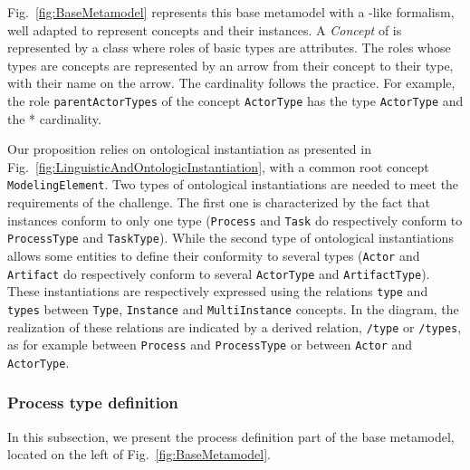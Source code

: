 Fig.~\ref{fig:BaseMetamodel} represents this base metamodel with a \UML-like
formalism, well adapted to represent \FML concepts and their instances. A
\textit{Concept} of \FML is represented by a \UML class where roles of basic
types are attributes. The roles whose types are concepts are represented by an
arrow from their concept to their type, with their name on the arrow. The
cardinality follows the \UML practice.  For example, the role
\texttt{parentActorTypes} of the concept \texttt{ActorType} has the type
\texttt{ActorType} and the * cardinality.

Our proposition relies on ontological instantiation as presented in
Fig.~\ref{fig:LinguisticAndOntologicInstantiation}, with a common root concept
\texttt{ModelingElement}. Two types of ontological instantiations are needed to
meet the requirements of the challenge. 
The first one is characterized by the fact that instances conform to only one
type (\texttt{Process} and \texttt{Task} do respectively conform to
\texttt{ProcessType} and \texttt{TaskType}). While the second type of
ontological instantiations allows some entities to define their conformity to
several types (\texttt{Actor} and \texttt{Artifact} do respectively conform to
several \texttt{ActorType} and \texttt{ArtifactType}). 
These instantiations are respectively expressed using
the relations \texttt{type} and \texttt{types} between \texttt{Type},
\texttt{Instance} and \texttt{MultiInstance} concepts. In the diagram, the
realization of these relations are indicated by a derived relation,
\texttt{/type} or \texttt{/types}, as for example between \texttt{Process} and
\texttt{ProcessType} or between \texttt{Actor} and \texttt{ActorType}.

\subsubsection{Process type definition}

In this subsection, we present the process definition part of the base
metamodel, located on the left of Fig.~\ref{fig:BaseMetamodel}.



